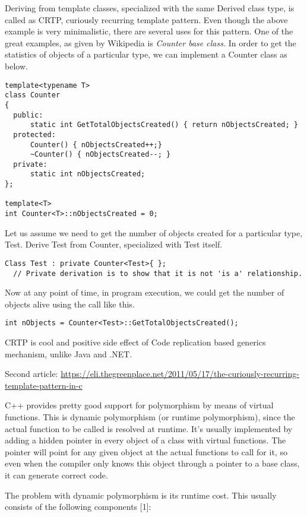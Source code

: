 \documentclass{book}
\begin{document}
Deriving from template classes, specialized with the same Derived class type, is called as CRTP, curiously recurring template pattern.
Even though the above example is very minimalistic, there are several uses for this pattern.
One of the great examples, as given by Wikipedia is \textit{Counter base class.}
In order to get the statistics of objects of a particular type, we can implement a Counter class as below.

\begin{lstlisting}
template<typename T>
class Counter
{
  public:
      static int GetTotalObjectsCreated() { return nObjectsCreated; }
  protected:
      Counter() { nObjectsCreated++;}
      ~Counter() { nObjectsCreated--; }
  private:
      static int nObjectsCreated;
};

template<T>
int Counter<T>::nObjectsCreated = 0;
\end{lstlisting}

Let us assume we need to get the number of objects created for a particular type, Test. Derive Test from Counter, specialized with Test itself.

\begin{verbatim}
Class Test : private Counter<Test>{ };
  // Private derivation is to show that it is not 'is a' relationship.
\end{verbatim}
Now at any point of time, in program execution, we could get the number of objects alive using the call like this.

\begin{verbatim}
int nObjects = Counter<Test>::GetTotalObjectsCreated();
\end{verbatim}

CRTP is cool and positive side effect of Code replication based generics mechanism, unlike Java and .NET. 

Second article:
\url{https://eli.thegreenplace.net/2011/05/17/the-curiously-recurring-template-pattern-in-c}

C++ provides pretty good support for polymorphism by means of virtual functions. 
This is dynamic polymorphism (or runtime polymorphism), since the actual function to be called is resolved at runtime. 
It's usually implemented by adding a hidden pointer in every object of a class with virtual functions. 
The pointer will point for any given object at the actual functions to call for it, so even when the compiler only knows this object through a pointer to a base class, it can generate correct code.

The problem with dynamic polymorphism is its runtime cost. This usually consists of the following components [1]:
\end{document}
